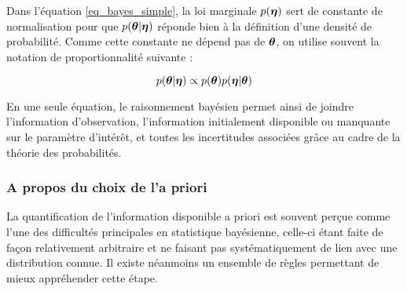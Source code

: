 	Dans l'équation \eqref{eq_bayes_simple}, la loi marginale $p({\bm{\eta}})$ sert de constante de normalisation pour que $p({\bm{\theta}} | {\bm{\eta}})$ réponde bien à la définition d'une densité de probabilité. Comme cette constante ne dépend pas de ${\bm{\theta}}$, on utilise souvent la notation de proportionnalité suivante : 
	
	\begin{equation}
	p({\bm{\theta}} | {\bm{\eta}}) \propto p({\bm{\theta}})p({\bm{\eta}} | {\bm{\theta}})
	\label{eq_bayes_proportionnalite}
	\end{equation}
	
	En une seule équation, le raisonnement bayésien permet ainsi de joindre l'information d'observation, l'information initialement disponible ou manquante sur le paramètre d'intérêt, et toutes les incertitudes associées grâce au cadre de la théorie des probabilités.
	
	\subsubsection{A propos du choix de l'a priori}
	
	La quantification de l'information disponible a priori est souvent perçue comme l'une des difficultés principales en statistique bayésienne, celle-ci étant faite de façon relativement arbitraire et ne faisant pas systématiquement de lien avec une distribution connue. Il existe néanmoins un ensemble de règles permettant de mieux appréhender cette étape.
	
